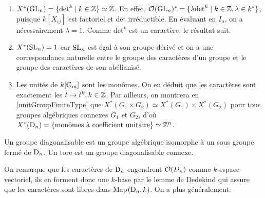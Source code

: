 \begin{ex}
\begin{enumerate}
\item $X^*(\operatorname{GL}_n)=\lbrace \det^k\mid k\in \mathbb{Z} \rbrace\simeq\mathbb{Z}$. En effet, $\mathcal{O}(\operatorname{GL}_n)^* =\lbrace \lambda\textrm{det}^k\mid k\in \mathbb{Z}, \lambda\in k^* \rbrace$, puisque $k[X_{ij}]$ est factoriel et det irréductible. En évaluant en $I_n$, on a nécessairement $\lambda=1$. Comme det$^k$ est un caractère, le résultat suit.
\item $X^*(\operatorname{SL}_n)={1}$ car $\operatorname{SL}_n$ est égal à son groupe dérivé et on a une correspondance naturelle entre le groupe des caractères d'un groupe et le groupe des caractères de son abélianisé.
\item Les unités de $k[\mathbb{G}_m]$ sont les monômes. On en déduit que les caractères sont exactement les $t\mapsto t^k, k\in \mathbb{Z}$. Par ailleurs, on montrera en \ref{unitGroupFiniteType} que $X^*(G_1\times G_2)\simeq X^*(G_1)\times X^*(G_2)$ pour tous groupes algébriques connexes $G_1$ et $G_2$, d'où $X^*(\operatorname{D}_n)=\lbrace \textrm{monômes à coefficient unitaire} \rbrace \simeq \mathbb{Z}^n$.
\end{enumerate}
\end{ex}

\begin{defn}
Un groupe diagonalisable est un groupe algébrique isomorphe à un sous groupe fermé de $\operatorname{D}_n$. Un tore est un groupe diagonalisable connexe.
\end{defn}

On remarque que les caractères de $\operatorname{D}_n$ engendrent $\mathcal{O}(D_n)$ comme $k$-espace vectoriel, ils en forment donc une $k$-base par le lemme de Dedekind qui assure que les caractères sont libres dans Map$(\operatorname{D}_n, k)$. On a plus généralement:

